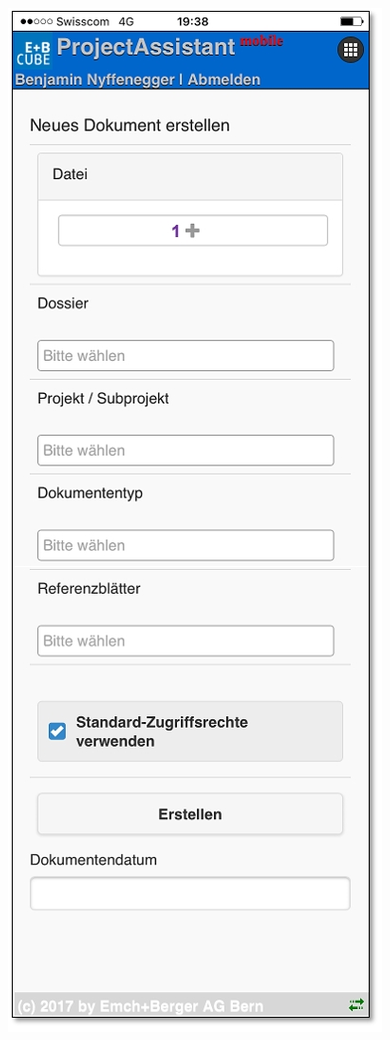 \begin{figure}   %
  \vspace{-35pt}      %
  \begin{center}
    \includegraphics[width=1\linewidth]{../chapters/11_Dokumentenablage/pictures/11-mob08_Dokument_erfassen.jpg}
  \end{center}
  \vspace{-20pt}
  \vspace{-10pt}
\end{figure}

